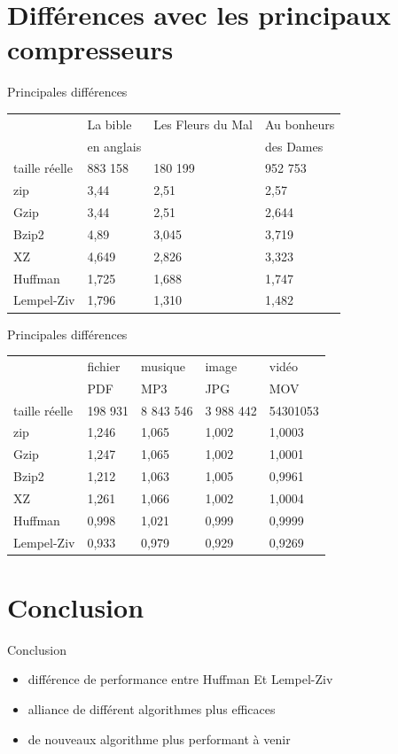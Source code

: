\documentclass[french]{beamer}
\begin{document}
\section{Différences avec les principaux compresseurs}
\begin{frame}{Principales différences}
	\begin{flushleft}
\begin{tabular}{|l|l|l|l|}
\hline
 & La bible & Les Fleurs du Mal  & Au bonheurs \\
 & en anglais & & des Dames \\ 
\hline
taille réelle & 883 158 & 180 199 & 952 753  \\\hline
zip & 3,44 & 2,51 & 2,57  \\
\hline
Gzip & 3,44 & 2,51 & 2,644 \\
\hline
Bzip2 & 4,89 & 3,045 & 3,719 \\
\hline
XZ & 4,649 & 2,826 & 3,323 \\
\hline
Huffman & 1,725 & 1,688 & 1,747  \\
\hline
Lempel-Ziv & 1,796 & 1,310 & 1,482 \\
\hline

\end{tabular}
\end{flushleft}
\end{frame}

\begin{frame}{Principales différences}
	\begin{flushleft}
\begin{tabular}{|l|l|l|l|l|}
\hline
 & fichier & musique & image & vidéo\\
 &  PDF & MP3 & JPG & MOV \\ 
\hline
taille réelle &  198 931 & 8 843 546 & 3 988 442 & 54301053 \\\hline
zip  & 1,246 & 1,065 & 1,002 & 1,0003 \\
\hline
Gzip & 1,247 & 1,065 & 1,002 & 1,0001 \\
\hline
Bzip2 & 1,212 & 1,063 & 1,005 & 0,9961\\
\hline
XZ & 1,261 & 1,066 & 1,002 & 1,0004\\
\hline
Huffman & 0,998 & 1,021 & 0,999 & 0,9999 \\
\hline
Lempel-Ziv & 0,933 & 0,979 & 0,929 & 0,9269\\
\hline

\end{tabular}
\end{flushleft}
\end{frame}

\section{Conclusion}
\begin{frame}{Conclusion}
	\begin{center}
		\begin{itemize}
		\item différence de performance entre Huffman Et Lempel-Ziv
		\item alliance de différent algorithmes plus efficaces
		\item de nouveaux algorithme plus performant à venir
		\end{itemize}
	\end{center}
\end{frame}
\end{document}
